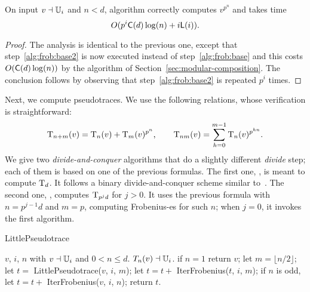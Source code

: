 \begin{theorem}
  \label{th:l-ifrob}
  On input $v\dashv\mathbb{U}_i$ and $n<d$, algorithm 
  correctly computes $v^{p^n}$ and takes time 
  \begin{equation}
    \label{eq:94}
    O(p^i\mathsf{C}(d)\log (n) + i\mathsf{L}(i))
    \text{.}    
  \end{equation}
\end{theorem}
\begin{proof}
  The analysis is identical to the previous one, except that
  step~\ref{alg:frob:base2} is now executed instead of
  step~\ref{alg:frob:base} and this costs $O(\mathsf{C}(d)\log (n))$ by
  the algorithm of Section~\ref{sec:modular-composition}. The
  conclusion follows by observing that step~\ref{alg:frob:base2} is
  repeated $p^i$ times.
\end{proof}

Next, we compute pseudotraces. We use the following relations, whose
verification is straightforward:
\begin{equation}
  \operatorname{T}_{n+m}(v) =
  \operatorname{T}_{n}(v) + \operatorname{T}_{m}(v)^{p^n}
  \text{,}\qquad
  \operatorname{T}_{nm}(v) =
  \sum_{h=0}^{m-1}\operatorname{T}_{n}(v)^{p^{hn}}
  \text{.}
\end{equation}
We give two \emph{divide-and-conquer} algorithms that do a slightly
different \emph{divide} step; each of them is based on one of the
previous formulas. The first one, , is meant to
compute $\operatorname{T}_d$. It follows a binary divide-and-conquer scheme
similar to~\todo\cite[Algorithm~5.2]{vzGS92}. The second one,
, computes $\operatorname{T}_{p^jd}$ for $j>0$. It uses the
previous formula with $n=p^{j-1}d$ and $m=p$, computing Frobenius-es
for such $n$; when $j=0$, it invokes the first algorithm.


\begin{algorithm}
  \caption{LittlePseudotrace}
  \begin{algorithmic}[1]
    \REQUIRE $v$, $i$, $n$ with $v\dashv\mathbb{U}_i$ and $0<n\le d$.
    \ENSURE $T_{n}(v) \dashv \mathbb{U}_i$.
    \STATE \label{alg:lpseudo:base} if $n = 1$ return $v$;
    \STATE \label{alg:lpseudo:half} let $m = \lfloor n/2 \rfloor$;
    \STATE \label{alg:lpseudo:rec} let $t=$ {\sf LittlePseudotrace}($v$,
    $i$, $m$);
    \STATE \label{alg:lpseudo:frob} let $t=t+$ {\sf IterFrobenius}($t$, $i$, $m$);
    \STATE \label{alg:lpseudo:odd} if $n$ is odd, let $t=t+$ {\sf
      IterFrobenius}($v$, $i$, $n$);
    \STATE return $t$.
  \end{algorithmic}
\end{algorithm}


